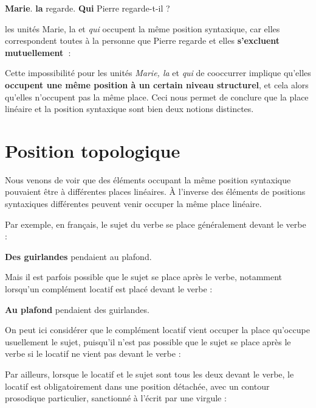 \ea
   \textbf{{Marie}}.
   \textbf{{la}}  {regarde.}
  \ex \textbf{{Qui}}  {Pierre regarde-t-il} ?
  \z
\z

les unités  {Marie, la} et \textit{qui} occupent la même position syntaxique, car elles correspondent toutes à la personne que Pierre regarde et elles \textbf{s’excluent} \textbf{mutuellement~}:

\ea
{}
\z
\z

Cette impossibilité pour les unités \textit{Marie, la} et \textit{qui} de cooccurrer implique qu’elles \textbf{occupent une même position à un certain niveau structurel}, et cela alors qu’elles n’occupent pas la même place. Ceci nous permet de conclure que la place linéaire et la position syntaxique sont bien deux notions distinctes.

\section{Position topologique}\label{sec:3.5.4}

Nous venons de voir que des éléments occupant la même position syntaxique pouvaient être à différentes places linéaires. À l’inverse des éléments de positions syntaxiques différentes peuvent venir occuper la même place linéaire.

Par exemple, en français, le sujet du verbe se place généralement devant le verbe :

\ea
\textbf{{Des guirlandes}}  {pendaient au plafond}.
\z

Mais il est parfois possible que le sujet se place après le verbe, notamment lorsqu’un complément locatif est placé devant le verbe :

\ea
\textbf{{Au plafond}}  {pendaient des guirlandes}.
\z

On peut ici considérer que le complément locatif vient occuper la place qu’occupe usuellement le sujet, puisqu’il n’est pas possible que le sujet se place après le verbe si le locatif ne vient pas devant le verbe :

\ea
{}
\z
\z

Par ailleurs, lorsque le locatif et le sujet sont tous les deux devant le verbe, le locatif est obligatoirement dans une position détachée, avec un contour prosodique particulier, sanctionné à l’écrit par une virgule :

